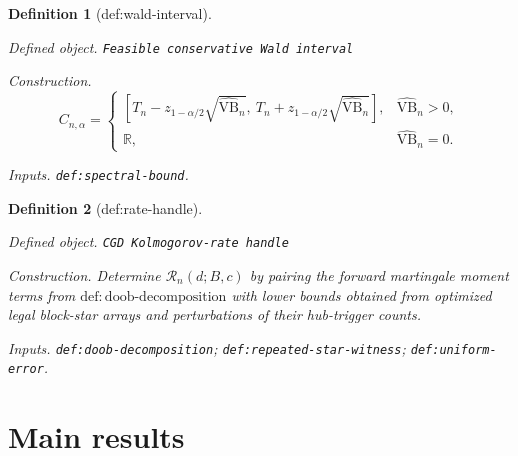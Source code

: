 \documentclass{article}
\newtheorem{definition}{Definition}
\begin{document}
\begin{definition}[def:wald-interval]\label{def:wald-interval}
\par\smallskip\noindent\emph{Defined object.} \texttt{Feasible conservative Wald interval}
\par\smallskip\noindent\emph{Construction.} \[C_{n,\alpha}=\begin{cases}[T_n-z_{1-\alpha/2}\sqrt{\widehat{\mathrm{VB}}_n},\ T_n+z_{1-\alpha/2}\sqrt{\widehat{\mathrm{VB}}_n}],&\widehat{\mathrm{VB}}_n>0,\\ \mathbb R,&\widehat{\mathrm{VB}}_n=0.\end{cases}\]
\par\smallskip\noindent\emph{Inputs.} \texttt{def:\allowbreak{}spectral-\allowbreak{}bound}.
\end{definition}

\begin{definition}[def:rate-handle]\label{def:rate-handle}
\par\smallskip\noindent\emph{Defined object.} \texttt{CGD Kolmogorov-\allowbreak{}rate handle}
\par\smallskip\noindent\emph{Construction.} Determine \(\mathcal R_n(d;B,c)\) by pairing the forward martingale moment terms from \(\mathrm{def:doob\text{-}decomposition}\) with lower bounds obtained from optimized legal block-star arrays and perturbations of their hub-trigger counts.
\par\smallskip\noindent\emph{Inputs.} \texttt{def:\allowbreak{}doob-\allowbreak{}decomposition}; \texttt{def:\allowbreak{}repeated-\allowbreak{}star-\allowbreak{}witness}; \texttt{def:\allowbreak{}uniform-\allowbreak{}error}.
\end{definition}

\section{Main results}
\end{document}
